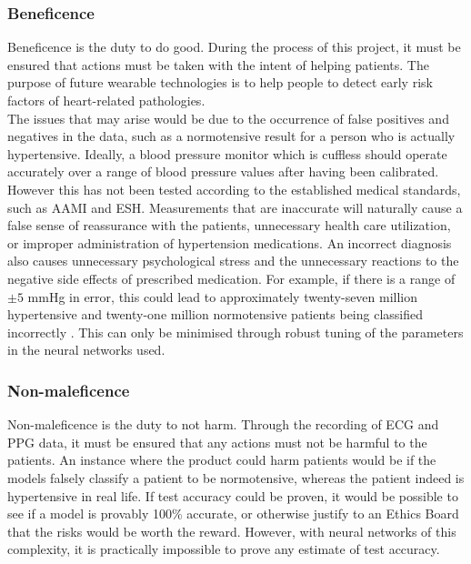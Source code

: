 \documentclass[11pt, a4paper]{article}
\begin{document}
\subsubsection{Beneficence}
Beneficence is the duty to do good. During the process of this project, it must be ensured that actions must be taken with the intent of helping patients. The purpose of future wearable technologies is to help people to detect early risk factors of heart-related pathologies. \\ \newline \noindent The issues that may arise would be due to the occurrence of false positives and negatives in the data, such as a normotensive result for a person who is actually hypertensive. Ideally, a blood pressure monitor which is cuffless should operate accurately over a range of blood pressure values after having been calibrated. However this has not been tested according to the established medical standards, such as AAMI and ESH. Measurements that are inaccurate will naturally cause a false sense of reassurance with the patients, unnecessary health care utilization, or improper administration of hypertension medications. An incorrect diagnosis also causes unnecessary psychological stress and the unnecessary reactions to the negative side effects of prescribed medication. For example, if there is a range of $\pm 5$ mmHg in error, this could lead to approximately twenty-seven million hypertensive and twenty-one million normotensive patients being classified incorrectly \cite{Bard2019}. This can only be minimised through robust tuning of the parameters in the neural networks used.

\subsubsection{Non-maleficence}
Non-maleficence is the duty to not harm. Through the recording of ECG and PPG data, it must be ensured that any actions must not be harmful to the patients. An instance where the product could harm patients would be if the models falsely classify a patient to be normotensive, whereas the patient indeed is hypertensive in real life. If test accuracy could be proven, it would be possible to see if a model is provably 100\% accurate, or otherwise justify to an Ethics Board that the risks would be worth the reward. However, with neural networks of this complexity, it is practically impossible to prove any estimate of test accuracy. 
\end{document}
